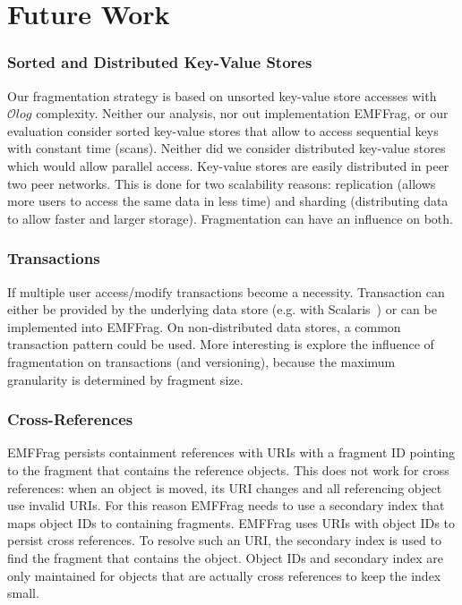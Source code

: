\section{Future Work} 
\label{future_work}

\subsubsection{Sorted and Distributed Key-Value Stores} 

Our fragmentation strategy is based on unsorted key-value store accesses with $\mathcal{O}log$ complexity. Neither our analysis, nor out  implementation EMFFrag, or our evaluation consider sorted key-value stores that allow to access sequential keys with constant time (scans). Neither did we consider distributed key-value stores which would allow parallel access. Key-value stores are easily distributed in peer two peer networks. This is done for two scalability reasons: replication (allows more users to access the same data in less time) and sharding (distributing data to allow faster and larger storage). Fragmentation can have an influence on both.

\subsubsection{Transactions}

If multiple user access/modify transactions become a necessity. Transaction can either be provided by the underlying data store (e.g. with Scalaris~\cite{ScalarisTransactions2008}) or can be implemented into EMFFrag. On non-distributed data stores, a common transaction pattern could be used. More interesting is explore the influence of fragmentation on transactions (and versioning), because the maximum granularity is determined by fragment size.

\subsubsection{Cross-References} 

EMFFrag persists containment references with URIs with a fragment ID pointing to the fragment that contains the reference objects. This does not work for cross references: when an object is moved, its URI changes and all referencing object use invalid URIs. For this reason EMFFrag needs to use a secondary index that maps object IDs to containing fragments. EMFFrag uses URIs with object IDs to persist cross references. To resolve such an URI, the secondary index is used to find the fragment that contains the object. Object IDs and secondary index are only maintained for objects that are actually cross references to keep the index small. 

